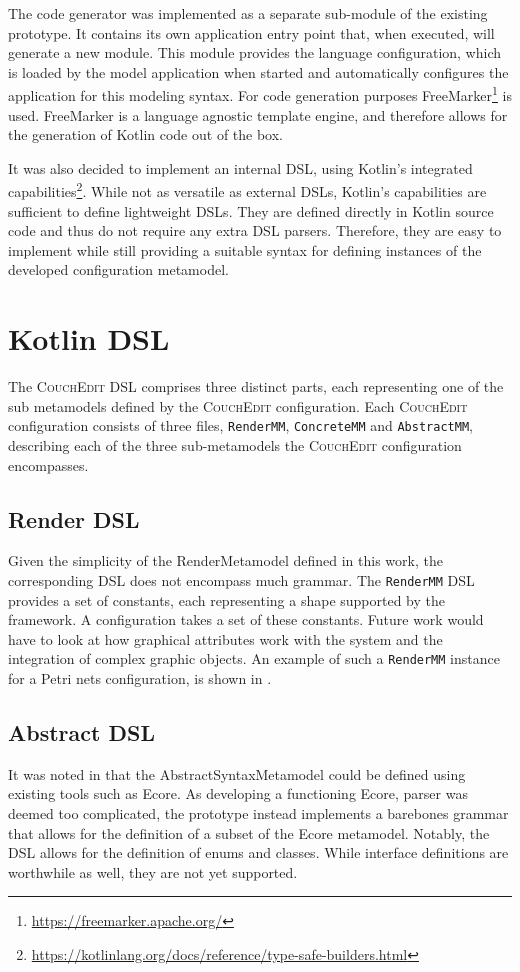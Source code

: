 The code generator was implemented as a separate sub-module of the existing prototype. It contains its own application entry point that, when executed, will generate a new module. This module provides the language configuration, which is loaded by the model application when started and automatically configures the application for this modeling syntax. For code generation purposes FreeMarker\footnote{\url{https://freemarker.apache.org/}} is used. FreeMarker is a language agnostic template engine, and therefore allows for the generation of Kotlin code out of the box.

It was also decided to implement an internal DSL, using Kotlin's integrated capabilities\footnote{\url{https://kotlinlang.org/docs/reference/type-safe-builders.html}}. While not as versatile as external DSLs, Kotlin's capabilities are sufficient to define lightweight DSLs. They are defined directly in Kotlin source code and thus do not require any extra DSL parsers. Therefore, they are easy to implement while still providing a suitable syntax for defining instances of the developed configuration metamodel.

\section{Kotlin DSL}
The \textsc{CouchEdit} DSL comprises three distinct parts, each representing one of the sub metamodels defined by the \textsc{CouchEdit} configuration. Each \textsc{CouchEdit} configuration consists of three files, \texttt{RenderMM}, \texttt{ConcreteMM} and \texttt{AbstractMM}, describing each of the three sub-metamodels the \textsc{CouchEdit} configuration encompasses.

\subsection{Render DSL}
Given the simplicity of the RenderMetamodel defined in this work, the corresponding DSL does not encompass much grammar. The \texttt{RenderMM} DSL provides a set of constants, each representing a shape supported by the framework. A configuration takes a set of these constants. Future work would have to look at how graphical attributes work with the system and the integration of complex graphic objects. An example of such a \texttt{RenderMM} instance for a Petri nets configuration, is shown in .

\subsection{Abstract DSL}
It was noted in  that the AbstractSyntaxMetamodel could be defined using existing tools such as Ecore. As developing a functioning Ecore, parser was deemed too complicated, the prototype instead implements a barebones grammar that allows for the definition of a subset of the Ecore metamodel. Notably, the DSL allows for the definition of enums and classes. While interface definitions are worthwhile as well, they are not yet supported.

